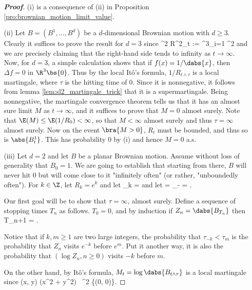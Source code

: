 \begin{proof}[\bf Proof]
\ben
\item [(i)] is a consequence of (ii) in Proposition \ref{pro:brownian_motion_limit_value}. 
\item [(ii)] Let $B = (B^1,\dots,B^d)$ be a $d$-dimensional Brownian motion with $d \geq 3$. Clearly it suffices to prove the result for $d = 3$ since
\be
{}^2 \geq R^2_t := \sum^3_{i=1} ^2
\ee
and we are precisely claiming that the right-hand side tends to infinity as $t \to \infty$. Now, for $d = 3$, a simple calculation shows that if $f(x) = 1/\dabs{x}$, then $\Delta f = 0$ in $\R^3\bs \{0\}$. Thus by the local It\^o's formula, $1/R_{t\land \tau}$ is a local martingale, where $\tau$ is the hitting time of 0. Since it is nonnegative, it follows from lemma \ref{lem:sl2_martingale_trick} that it is a supermartingale. Being nonnegative, the martingale convergence theorem tells us that it has an almost sure limit $M$ as $t \to \infty$, and it suffices to prove that $M = 0$ almost surely. Note that $\E(M) \leq \E(1/R_0) < \infty$, so that $M < \infty$ almost surely and thus $\tau = \infty$ almost surely. Now on the event $\bra{M > 0}$, $R_t$ must be bounded, and thus so is $\abs{B^1_t}$. This has probability 0 by (i) and hence $M = 0$ a.s.

\item [(iii)] Let $d = 2$ and let $B$ be a planar Brownian motion. Assume without loss of generality that $B_0 = 1$. We are going to establish that starting from there, $B$ will never hit 0 but will come close to it "infinitely often" (or rather, "unboundedly often"). For $k \in \Z$, let $R_k = e^k$ and let
\be
\tau_k = \inf{}
\ee
and let
\be
\tau = \tau_{-\infty} = \inf{}.
\ee

Our first goal will be to show that $\tau = \infty$, almost surely. Define a sequence of stopping times $T_n$ as follows. $T_0 = 0$, and by induction if $Z_n = \dabs{B_{T_n}}$ then
\be
T_{n+1} = \inf{}.
\ee

Notice that if $k,m \geq 1$ are two large integers, the probability that $\tau_{-k} < \tau_m$ is the probability that $Z_n$ visits $e^{-k}$ before $e^m$. Put it another way, it is also the probability that $(\log Z_n, n \geq 0)$ visits $-k$ before $m$.

On the other hand, by It\^o's formula, $M_t = \log \dabs{B_{t\land \tau}}$ is a local martingale since
\be
(x, y) \mapsto \log(x^2 + y^2) \ \R^2 \bs \{(0, 0)\}.
\ee


\end{proof}
